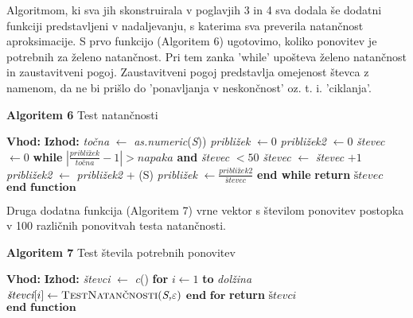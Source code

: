 \documentclass[12pt,a4paper]{amsart}
\theoremstyle{definition} %
\theoremstyle{plain} %
\begin{document}
Algoritmom, ki sva jih skonstruirala v poglavjih 3 in 4 sva dodala še dodatni funkciji predstavljeni v nadaljevanju, s katerima sva preverila natančnost aproksimacije. S prvo funkcijo (Algoritem 6) ugotovimo, koliko ponovitev je potrebnih za želeno natančnost. Pri tem zanka 'while' upošteva želeno natančnost in zaustavitveni pogoj. Zaustavitveni pogoj predstavlja omejenost števca z namenom, da ne bi prišlo do 'ponavljanja v neskončnost' oz. t. i. 'ciklanja'. 

\begin{algorithm}[H]
\caption{\textbf{Algoritem 6} Test natančnosti}\label{natančnost}
\begin{algorithmic}[1]
\Statex\textbf{Vhod:} 
\Statex\textbf{Izhod:} 
\State \textit{točna} $\gets$ \textit{as.numeric}(\textit{S})) 
\State \textit{približek} $\gets 0$ 
\State \textit{približek2} $\gets 0$ 
\State \textit{števec} $\gets 0$ 
\State \textbf{while} {$|\frac{\textit{približek}}{\textit{točna}} - 1| > \textit{napaka}$ \textbf{and} \textit{števec} $< 50$}
	\State \hspace{6mm} \textit{števec} $\gets$ \textit{števec} $+ 1$ 
	\State \hspace{6mm} \textit{približek2} $\gets$ \textit{približek2} + (S) 
	\State \hspace{6mm} \textit{približek} $\gets \frac{\textit{približek2}}{\textit{števec}}$ 
\State \textbf{end while}
\State \textbf{return} $\textit{števec}$ \\
$\textbf{end function}$
\EndFunction
\end{algorithmic}
\end{algorithm}

Druga dodatna funkcija (Algoritem 7) vrne vektor s številom ponovitev postopka v 100 različnih ponovitvah testa natančnosti.

\begin{algorithm}[H]
\caption{\textbf{Algoritem 7} Test števila potrebnih ponovitev}\label{ponovitve}
\begin{algorithmic}[1]
\Statex\textbf{Vhod:} 
\Statex\textbf{Izhod:} 
\State \textit{števci} $\gets$ \textit{c}(\hspace{1mm})
\State \textbf{for} {$\textit{i} \gets 1$ \textbf{to} \textit{dolžina}}
		\State \hspace{6mm} $\textit{števci}[i] \gets \textproc{TestNatančnosti}(\textit{S,$\varepsilon$})$
\State $\textbf{end for}$
\State \textbf{return} $\textit{števci}$ \\
$\textbf{end function}$
\EndFunction
\end{algorithmic}
\end{algorithm}
\end{document}
